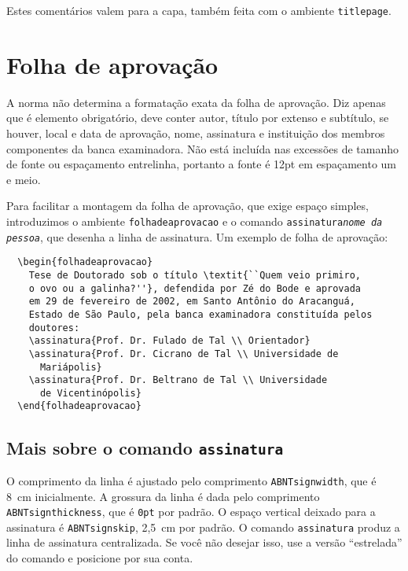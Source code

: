 \documentclass[espaco=simples,appendix=Name]{abnt}
\newcommand{\ac}{\symbol{123}}  %
\newcommand{\fc}{\symbol{125}}  %
\newcommand{\bs}{\symbol{92}}   %
\begin{document}
\noindent Estes comentários valem para a capa, também feita com o
ambiente \texttt{titlepage}.



\section{Folha de aprovação}

A norma \cite{NBR14724:2001} não determina a formatação exata da folha
de aprovação. Diz apenas que é elemento obrigatório, deve conter autor,
título por extenso e subtítulo, se houver, local e data de aprovação, nome,
assinatura e instituição dos membros componentes da banca examinadora. Não
está incluída nas excessões de tamanho de fonte ou espaçamento entrelinha,
portanto a fonte é 12pt em espaçamento um e meio.

Para facilitar a montagem da folha de aprovação, que exige espaço simples,
introduzimos o ambiente \texttt{folhadeaprovacao} e o comando
\texttt{\bs assinatura\ac\textit{nome da pessoa}\fc}, que desenha a linha de
assinatura. Um exemplo de folha de aprovação:

\begin{verbatim}
  \begin{folhadeaprovacao}
    Tese de Doutorado sob o título \textit{``Quem veio primiro,
    o ovo ou a galinha?''}, defendida por Zé do Bode e aprovada
    em 29 de fevereiro de 2002, em Santo Antônio do Aracanguá,
    Estado de São Paulo, pela banca examinadora constituída pelos
    doutores:
    \assinatura{Prof. Dr. Fulado de Tal \\ Orientador}
    \assinatura{Prof. Dr. Cicrano de Tal \\ Universidade de
      Mariápolis}
    \assinatura{Prof. Dr. Beltrano de Tal \\ Universidade
      de Vicentinópolis} 
  \end{folhadeaprovacao}
\end{verbatim}

\subsection*{Mais sobre o comando  \texttt{\bs assinatura}}

O comprimento da linha é ajustado pelo comprimento
\texttt{\bs ABNTsignwidth}, que é 8~cm inicialmente. A grossura da linha é
dada pelo comprimento \texttt{\bs ABNTsignthickness}, que é \texttt{0pt}
por padrão. O espaço vertical deixado para a assinatura é
\texttt{\bs ABNTsignskip}, 2,5~cm por padrão. O comando
\texttt{\bs assinatura} produz a linha de assinatura centralizada. Se você
não desejar isso, use a versão ``estrelada'' do comando e posicione por sua
conta.
\end{document}
